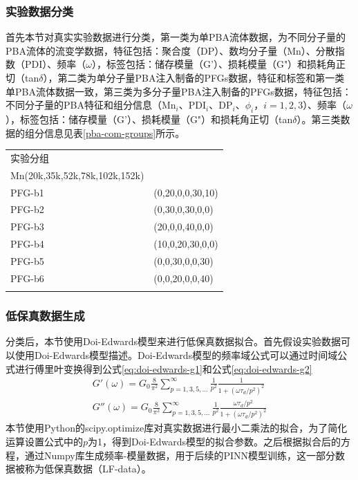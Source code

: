 \subsubsection{实验数据分类}
首先本节对真实实验数据进行分类，第一类为单PBA流体数据，为不同分子量的PBA流体的流变学数据，特征包括：聚合度（DP）、数均分子量（Mn）、分散指数（PDI）、频率（$\omega$），标签包括：储存模量（G'）、损耗模量（G"）和损耗角正切（tan$\delta$），第二类为单分子量PBA注入制备的PFGs数据，特征和标签和第一类单PBA流体数据一致，第三类为多分子量PBA注入制备的PFGs数据，特征包括：不同分子量的PBA特征和组分信息（Mn$_i$、PDI$_i$、DP$_i$、$\phi_i$，$i=1,2,3$）、频率（$\omega$），标签包括：储存模量（G'）、损耗模量（G"）和损耗角正切（tan$\delta$）。第三类数据的组分信息见表\ref{pba-com-groups}所示。
\begin{table}
  \centering
  \small
  \begin{tabularx}{\textwidth}{>{\centering\arraybackslash}X >{\centering\arraybackslash}X} %
    \Xhline{1.5pt}
    实验分组   & \makecell{
      \begin{tabular}{@{}c@{}}
        $\phi_{PBA}(\%)$ \\
        \Xhline{0.5pt}
        Mn(20k,35k,52k,78k,102k,152k)
      \end{tabular}
    }                         \\
    \Xhline{0.5pt}
    PFG-b1 & (0,20,0,0,30,10) \\
    PFG-b2 & (0,30,0,30,0,0)  \\
    PFG-b3 & (20,0,0,40,0,0)  \\
    PFG-b4 & (10,0,20,30,0,0) \\
    PFG-b5 & (0,0,30,0,0,30)  \\
    PFG-b6 & (0,0,20,0,0,40)  \\
    \Xhline{1.5pt}
  \end{tabularx}
\end{table}
\subsubsection{低保真数据生成}
分类后，本节使用Doi-Edwards模型来进行低保真数据拟合。首先假设实验数据可以使用Doi-Edwards模型描述。Doi-Edwards模型的频率域公式可以通过时间域公式进行傅里叶变换得到公式\eqref{eq:doi-edwards-g1}和公式\eqref{eq:doi-edwards-g2}
\begin{align}
  G'(\omega) = G_0 \frac{8}{\pi^2} \sum_{p=1,3,5,\ldots}^{\infty} \frac{1}{p^2} \frac{1}{1 + (\omega \tau_d / p^2)^2} \label{eq:doi-edwards-g1} \\
  G''(\omega) = G_0 \frac{8}{\pi^2} \sum_{p=1,3,5,\ldots}^{\infty} \frac{1}{p^2} \frac{\omega \tau_d / p^2}{1 + (\omega \tau_d / p^2)^2}
  \label{eq:doi-edwards-g2}
\end{align}
本节使用Python的scipy.optimize库对真实数据进行最小二乘法的拟合，为了简化运算设置公式中的$p$为1，得到Doi-Edwards模型的拟合参数。之后根据拟合后的方程，通过Numpy库生成频率-模量数据，用于后续的PINN模型训练，这一部分数据被称为低保真数据（LF-data）。

